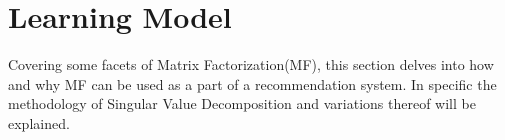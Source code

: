 \section{Learning Model}
Covering some facets of Matrix Factorization(MF), this section delves into how and why MF can be used as a part of a recommendation system. In specific the methodology of Singular Value Decomposition and variations thereof will be explained. 
%
%

